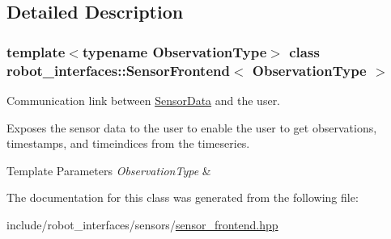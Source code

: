 \subsection{Detailed Description}
\subsubsection*{template$<$typename Observation\+Type$>$\newline
class robot\+\_\+interfaces\+::\+Sensor\+Frontend$<$ Observation\+Type $>$}

Communication link between \hyperlink{classrobot__interfaces_1_1SensorData}{Sensor\+Data} and the user. 

Exposes the sensor data to the user to enable the user to get observations, timestamps, and timeindices from the timeseries.


\begin{DoxyTemplParams}{Template Parameters}
{\em Observation\+Type} & \\
\hline
\end{DoxyTemplParams}


The documentation for this class was generated from the following file\+:\begin{DoxyCompactItemize}
\item 
include/robot\+\_\+interfaces/sensors/\hyperlink{sensor__frontend_8hpp}{sensor\+\_\+frontend.\+hpp}\end{DoxyCompactItemize}
